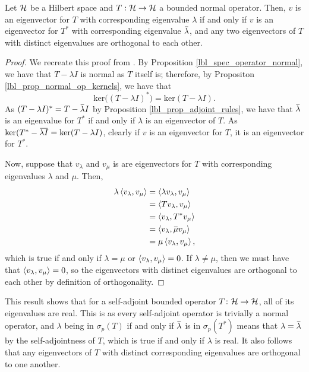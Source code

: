 \begin{proposition} \label{lbl_prop_normal_means_orthogonal_eigenvectors}
  Let $\mathcal{H}$ be a Hilbert space and $T: \mathcal{H} \to \mathcal{H}$ a bounded normal operator. Then, $v$ is an eigenvector for $T$ with corresponding eigenvalue $\lambda$ if and only if $v$ is an eigenvector for $T^*$ with corresponding eigenvalue $\conjugate{\lambda}$, and any two eigenvectors of $T$ with distinct eigenvalues are orthogonal to each other.
\end{proposition}
\begin{proof}
  We recreate this proof from {\cite[Proposition 15.13]{muscat}}. By Proposition \eqref{lbl_spec_operator_normal}, we have that $T - \lambda I$ is normal as $T$ itself is; therefore, by Propositon \eqref{lbl_prop_normal_op_kernels}, we have that
  \begin{equation*}
    \text{ker}\big((T - \lambda I)^*\big) = \text{ker}(T - \lambda I).
  \end{equation*}
  As $(T - \lambda I)^* = T - \conjugate{\lambda}I$ by Proposition \eqref{lbl_prop_adjoint_rules}, we have that $\conjugate{\lambda}$ is an eigenvalue for $T^*$ if and only if $\lambda$ is an eigenvector of $T$. As $\text{ker}(T^* - \conjugate{\lambda I} = \text{ker}(T - \lambda I)$, clearly if $v$ is an eigenvector for $T$, it is an eigenvector for $T^*$.

  \medskip

  Now, suppose that $v_{\lambda}$ and $v_{\mu}$ is are eigenvectors for $T$ with corresponding eigenvalues $\lambda$ and $\mu$. Then,
  \begin{align*}
    \lambda \ip{v_{\lambda}, v_{\mu}}
    &=
    \ip{\lambda v_{\lambda}, v_{\mu}} \\
    &=
    \ip{T v_{\lambda}, v_{\mu}} \\
    &=
    \ip{v_{\lambda}, T^* v_{\mu}} \\
    &=
    \ip{v_{\lambda}, \conjugate{\mu} v_{\mu}} \\
    &=
    \mu \ip{v_{\lambda}, v_{\mu}},
  \end{align*}
  which is true if and only if $\lambda = \mu$ or $\left\langle v_\lambda, v_\mu\right\rangle = 0$. If $\lambda \neq \mu$, then we must have that  $\left\langle v_\lambda, v_\mu\right\rangle = 0$, so the eigenvectors with distinct eigenvalues are orthogonal to each other by definition of orthogonality.
\end{proof}
\begin{remark}\label{lbl_remark_sa_op_real_eigenvalues}
  This result shows that for a self-adjoint bounded operator $T \colon \mathcal{H} \to \mathcal{H}$, all of its eigenvalues are real. This is as every self-adjoint operator is trivially a normal operator, and $\lambda$ being in $\sigma_p(T)$ if and only if $\conjugate{\lambda}$ is in $\sigma_p(T^*)$ means that $\lambda = \conjugate{\lambda}$ by the self-adjointness of $T$, which is true if and only if $\lambda$ is real. It also follows that any eigenvectors of $T$ with distinct corresponding eigenvalues are orthogonal to one another.
\end{remark}

